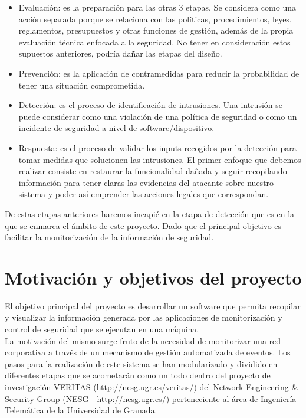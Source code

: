 \begin{itemize}
\item Evaluación: es la preparación para las otras 3 etapas. Se considera como una acción separada porque se relaciona con las políticas, procedimientos, leyes, reglamentos, presupuestos y otras funciones de gestión, además de la propia evaluación técnica enfocada a la seguridad. No tener en consideración estos supuestos anteriores, podría dañar las etapas del diseño.
\item Prevención: es la aplicación de contramedidas para reducir la probabilidad de tener una situación comprometida.
\item Detección: es el proceso de identificación de intrusiones. Una intrusión se puede considerar como una violación de una política de seguridad o como un incidente de seguridad a nivel de software/dispositivo.
\item Respuesta: es el proceso de validar los inputs recogidos por la detección para tomar medidas que solucionen las intrusiones. El primer enfoque que debemos realizar consiste en restaurar la funcionalidad dañada y seguir recopilando información para tener claras las evidencias del atacante sobre nuestro sistema y poder así emprender las acciones legales que correspondan.
\end{itemize}

De estas etapas anteriores haremos incapié en la etapa de detección que es en la que se enmarca el ámbito de este proyecto. Dado que el principal objetivo es facilitar la monitorización de la información de seguridad.

\section{Motivación y objetivos del proyecto}

El objetivo principal del proyecto es desarrollar un software que permita recopilar y visualizar la información generada por las aplicaciones de monitorización y control de seguridad que se ejecutan en una máquina.\\

La motivación del mismo surge fruto de la necesidad de monitorizar una red corporativa a través de un mecanismo de gestión automatizada de eventos. Los pasos para la realización de este sistema se han modularizado y dividido en diferentes etapas que se acometarán como un todo dentro del proyecto de investigación VERITAS (\url{http://nesg.ugr.es/veritas/}) del Network Engineering \& Security Group (NESG - \url{http://nesg.ugr.es/}) perteneciente al área de Ingeniería Telemática de la Universidad de Granada.\\

